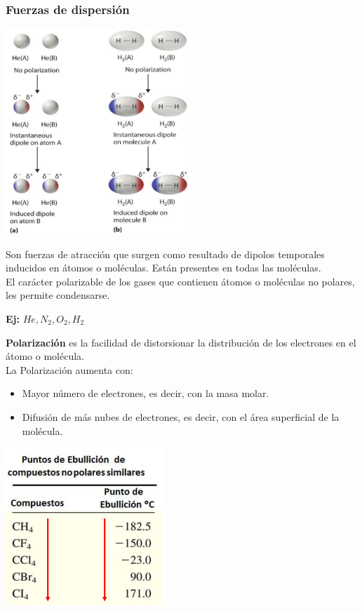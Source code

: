         \subsubsection{Fuerzas de dispersión}
            \begin{center} \includegraphics[width=7cm]{./imagenes/fuerzasDeDispersion.png} \end{center}
            \sangria{} Son fuerzas de atracción que surgen como resultado de dipolos temporales inducidos en átomos o moléculas. Están presentes en todas las moléculas. \\
            \sangria{} El carácter polarizable de los gases que contienen átomos o moléculas no polares, les permite condensarse. 
            \begin{center} \textbf{Ej:} $He, N_2, O_2, H_ 2$ \end{center}
            \sangria{} \textbf{Polarización} es la facilidad de distorsionar la distribución de los electrones en el átomo o molécula. \\
            \sangria{} La Polarización aumenta con:
            \begin{itemize}
                \item Mayor número de electrones, es decir, con la masa molar.
                \item Difusión de más nubes de electrones, es decir, con el área superficial de la molécula.
            \end{itemize}
            \begin{center} \includegraphics[width=6cm]{./imagenes/ebullicionDeCompuestosNoPolaresSimilares.png} \end{center}
